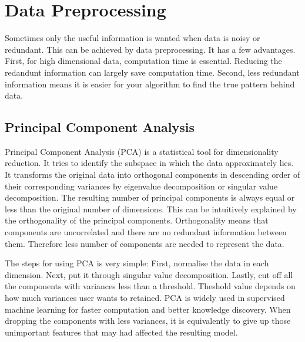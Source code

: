 \documentclass[11pt]{report}
\numberwithin{equation}{chapter}
\begin{document}
\begin{spacing}{2}
\begin{figure}[!htb]
\end{figure}

\newpage
\section{Data Preprocessing}
\label{sec:preprocessing}
Sometimes only the useful information is wanted when data is noisy or redundant. This can be achieved by data preprocessing. It has a few advantages. First, for high dimensional data, computation time is essential. Reducing the redandunt information can largely save computation time. Second, less redundant information means it is easier for your algorithm to find the true pattern behind data. 

\subsection{Principal Component Analysis}
Principal Component Analysis (PCA) is a statistical tool for dimensionality reduction. It tries to identify the subspace in which the data approximately lies\cite{PCA_AN}. It transforms the original data into orthogonal components in descending order of their corresponding variances\cite{jolliffe2002principal} by eigenvalue decomposition or singular value decomposition\cite{golub1965calculating}. The resulting number of principal components is always equal or less than the original number of dimensions. This can be intuitively explained by the orthogonality of the principal components. Orthogonality means that components are uncorrelated and there are no redundant information between them. Therefore less number of components are needed to represent the data. 

The steps for using PCA is very simple: First, normalise the data in each dimension. Next, put it through singular value decomposition. Lastly, cut off all the components with variances less than a threshold. Theshold value depends on how much variances user wants  to retained. PCA is widely used in supervised machine learning for faster computation and better knowledge discovery. When dropping the components with less variances, it is equivalently to give up those unimportant features that may had affected the resulting model.  

 

\end{spacing}
\end{document}
